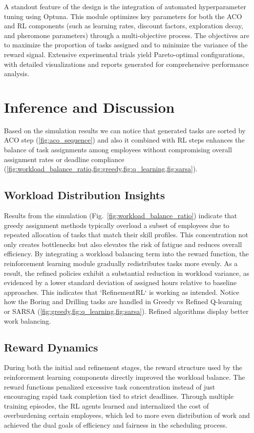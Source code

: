\documentclass[%
aip,
cp,  %
amsmath,amssymb,
reprint,%
]{revtex4-2}
\begin{document}
	A standout feature of the design is the integration of automated hyperparameter tuning using Optuna. This module optimizes key parameters for both the ACO and RL components (such as learning rates, discount factors, exploration decay, and pheromone parameters) through a multi-objective process. The objectives are to maximize the proportion of tasks assigned and to minimize the variance of the reward signal. Extensive experimental trials yield Pareto-optimal configurations, with detailed visualizations and reports generated for comprehensive performance analysis.
	
	\section{\label{sec:inference}Inference and Discussion}
	Based on the simulation results we can notice that generated tasks are sorted by ACO step (\cref{fig:aco_sequence}) and also it combined with RL steps enhances the balance of task assignments among employees without compromising overall
	assignment rates or deadline compliance (\cref{fig:workload_balance_ratio,fig:greedy,fig:q_learning,fig:sarsa}).
	
	\subsection{\label{subsec:workload}Workload Distribution Insights}
	Results from the simulation (Fig.~\ref{fig:workload_balance_ratio}) indicate that greedy assignment methods typically overload a subset of employees due to repeated allocation of tasks that match their skill profiles. This concentration not only creates bottlenecks but also elevates the risk of fatigue and reduces overall efficiency. By integrating a workload balancing term into the reward function, the reinforcement learning module gradually redistributes tasks more evenly. As a result, the refined policies exhibit a substantial
	reduction in workload variance, as evidenced by a lower standard deviation of
	assigned hours relative to baseline approaches. This indicates that `RefinementRL` is working as intended. Notice how the Boring and Drilling tasks are handled in Greedy vs Refined Q-learning or SARSA  (\cref{fig:greedy,fig:q_learning,fig:sarsa}). Refined algorithms display better work balancing.
	
	\subsection{\label{subsec:rationale}Reward Dynamics}
	During both the initial and refinement stages, the reward structure used by the reinforcement learning components directly improved the workload balance. The reward functions penalized excessive task concentration instead of just encouraging rapid task completion tied to strict deadlines. Through multiple training episodes, the RL agents learned and internalized the cost of overburdening certain employees, which led to more even distribution of work and achieved the dual goals of efficiency and fairness in the scheduling process.
	
\end{document}
